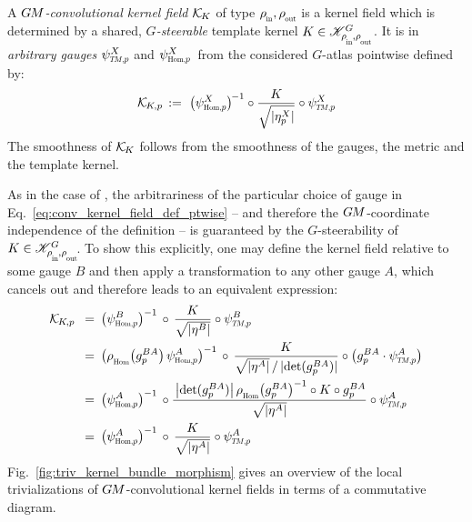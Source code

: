 \begin{dfn}
\label{dfn:conv_kernel_field}
    A \emph{$G\mkern-1.4muM$-convolutional kernel field} $\mathcal{K}_{\mkern-2mu K}$ of type $\rhoin,\rhoout$ is a kernel field which is determined by a shared, \emph{$G$-steerable} template kernel $K \in \KG$.
    It is in \emph{arbitrary gauges} $\psiTMp^X$ and $\psiHomp^X\,$ from the considered $G$-atlas pointwise defined by:
    \begin{align}\label{eq:conv_kernel_field_def_ptwise}
        \KKp \,:=\ \big(\psiHomp^X\big)^{\mkern-2mu-1} \circ \frac{K}{\sqrt{|\eta_p^X|}} \circ \psiTMp^X
    \end{align}
    The smoothness of $\mathcal{K}_{\mkern-2mu K}$ follows from the smoothness of the gauges, the metric and the template kernel.
\end{dfn}
As in the case of \onexoneGMs, the arbitrariness of the particular choice of gauge in Eq.~\eqref{eq:conv_kernel_field_def_ptwise} -- and therefore the $G\mkern-1.4muM$-coordinate independence of the definition -- is guaranteed by the $G$-steerability of $K\in\KG\!$.
To show this explicitly, one may define the kernel field relative to some gauge $B$ and then apply a transformation to any other gauge $A$, which cancels out and therefore leads to an equivalent expression:
\begin{align}\label{eq:arbitrariness_gauge_GM_kernel_field_def}
    \KKp
    \,\ =&\,\ \big(\psiHomp^B \big)^{-1} \,\circ \,\frac{K}{\sqrt{|\eta^B|}} \circ \psiTMp^B \notag \\
    \,\ =&\,\ \big( \rhoHom\big(g_p^{BA}\big)\, \psiHomp^A \big)^{-1} \,\circ \,\frac{K}{\sqrt{|\eta^A|} \,/\, |\! \det(g_p^{BA})| } \circ \big( g_p^{BA}\cdot \psiTMp^A \big) \notag \\
    \,\ =&\,\ \big(\psiHomp^A \big)^{-1} \,\circ \frac{\,\big|\! \det(g_p^{BA})\big|\, \rhoHom\big(g_p^{BA}\big)^{-1} \circ K \circ g_p^{BA}}{\sqrt{|\eta^A|}} \circ \psiTMp^A \notag \\
    \,\ =&\,\ \big(\psiHomp^A \big)^{-1} \,\circ \,\frac{K}{\sqrt{|\eta^A|}} \circ \psiTMp^A
\end{align}
Fig.~\ref{fig:triv_kernel_bundle_morphism} gives an overview of the local trivializations of $G\mkern-1.4muM$-convolutional kernel fields in terms of a commutative diagram.

